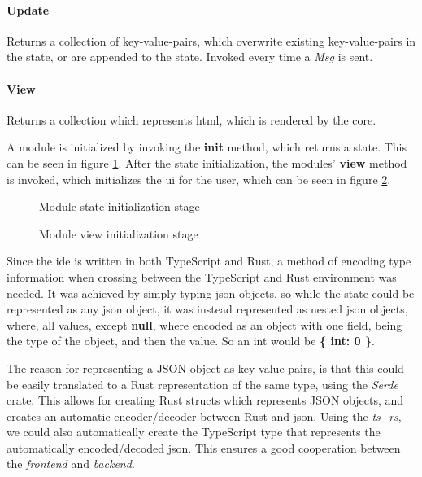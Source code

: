\paragraph{Update} Returns a collection of key-value-pairs, which
overwrite existing key-value-pairs in the state, or are appended to the state.
Invoked every time a \textit{Msg} is sent.

\paragraph{View} Returns a collection which represents \gls*{html},
which is rendered by the core.

A module is initialized by invoking the \textbf{init} method, which returns a
state. This can be seen in figure \ref{fig:moduleInit}. After the state
initialization, the modules' \textbf{view} method is invoked, which initializes
the \gls*{ui} for the user, which can be seen in figure \ref{fig:moduleInitView}.

\begin{figure}
  \centering
  
  \caption{Module state initialization stage}
  \label{fig:moduleInit}
\end{figure}

\begin{figure}
  \centering
  
  \caption{Module view initialization stage}
  \label{fig:moduleInitView}
\end{figure}

Since the \gls*{ide} is written in both TypeScript and Rust, a method of encoding
type information when crossing between the TypeScript and Rust environment was
needed. It was achieved by simply typing \gls*{json} objects, so while the state
could be represented as any \gls*{json} object, it was instead represented as
nested \gls*{json} objects, where, all values, except \textbf{null}, where
encoded as an object with one field, being the type of the object, and then the
value. So an int would be \textbf{\{ int: 0 \}}.

The reason for representing a JSON object as key-value pairs, is that this could
be easily translated to a Rust representation of the same type, using the
\textit{Serde} crate. This allows for creating Rust structs which represents
JSON objects, and creates an automatic encoder/decoder between Rust and
\gls*{json}. Using the \textit{ts\_rs}, we could also automatically create the
TypeScript type that represents the automatically encoded/decoded \gls*{json}.
This ensures a good cooperation between the \textit{frontend} and
\textit{backend}.

